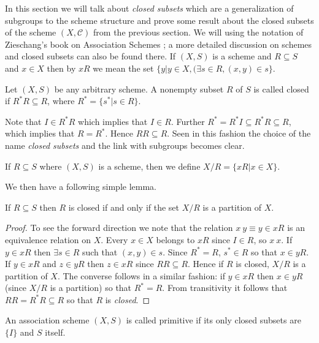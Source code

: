       In this section we will talk about \emph{closed subsets} which are a generalization of subgroups to the scheme structure and prove some result about the closed subsets of the scheme $(X,\mathcal{C})$ from the previous 
      section. We will using the notation of Zieschang's book on Association Schemes \cite{zieschang}; a more detailed discussion on schemes and closed subsets can also be found there. If $(X,S)$ is a scheme and $R \subseteq S$
      and $x \in X$ then by $xR$ we mean the set $\{y|y \in X,(\exists s \in R,(x,y) \in s\}$.


      \begin{definition}
	      Let $(X,S)$ be any arbitrary scheme. A nonempty subset $R$ of $S$ is called closed if $R^*R \subseteq R$, where $R^*=\{s^*|s \in R\}$.
      \end{definition}

      Note that $I \in R^*R$ which implies that $I \in R$. Further $R^* = R^*I \subseteq R^*R \subseteq R$, which implies that $R=R^*$. Hence $RR \subseteq R$.	Seen in this fashion the choice of the name \emph{closed subsets}
      and the link with subgroups becomes clear. 

      \begin{definition}
	 If $R \subseteq S$ where $(X,S)$ is a scheme, then we define $X/R = \{xR|x \in X\}$.
 \end{definition}


 	We then have a following simple lemma.

	\begin{lemma}\label{partition}
		If $R \subseteq S$ then $R$ is closed if and only if the set $X/R$ is a partition of $X$.
	\end{lemma}

	\begin{proof}
		To see the forward direction we note that the relation $x~y \equiv y \in xR$ is an equivalence relation on $X$. Every $x \in X$ belongs to $xR$ since $I \in R$, so $x ~ x$. If $y \in xR$ then $\exists s \in R$ such 
		that $(x,y) \in s$. Since $R^* = R$, $s^* \in R$ so that $x \in yR$. If $y \in xR$ and $z \in yR$ then $z \in xR$ since $RR \subseteq R$. Hence if $R$ is closed, $X/R$ is a partition of $X$.
		The converse follows in a similar fashion: if $y \in xR$ then $x \in yR$ (since $X/R$ is a partition) so that $R^*=R$. From transitivity it follows that $RR = R^*R \subseteq R$ so that $R$ is \emph{closed}.
	\end{proof}

	\begin{definition}\label{primitivescheme}
		An association scheme $(X,S)$ is called primitive if its only closed subsets are $\{I\}$ and $S$ itself.
        \end{definition}

